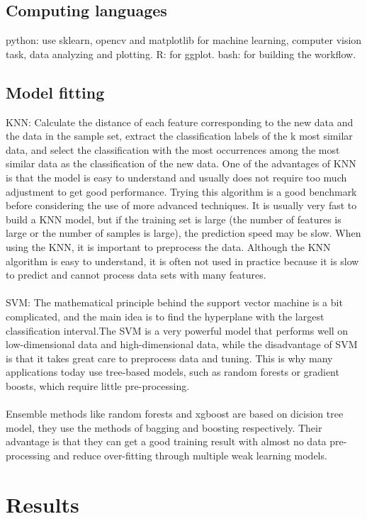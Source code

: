 \documentclass[11pt]{article}
\begin{document}
\subsection{Computing languages}
python: use sklearn, opencv and matplotlib for machine learning, computer vision task, data analyzing and plotting.
R: for ggplot.
bash: for building the workflow.


\subsection{Model fitting}
KNN: Calculate the distance of each feature corresponding to the new data and the data in the sample set, extract the classification labels of the k most similar data, and select the classification with the most occurrences among the most similar data as the classification of the new data. One of the advantages of KNN is that the model is easy to understand and usually does not require too much adjustment to get good performance. Trying this algorithm is a good benchmark before considering the use of more advanced techniques. It is usually very fast to build a KNN model,  but if the training set is large (the number of features is large or the number of samples is large), the prediction speed may be slow. When using the KNN, it is important to preprocess the data. Although the KNN algorithm is easy to understand, it is often not used in practice because it is slow to predict and cannot process data sets with many features.
\\
\\
SVM: The mathematical principle behind the support vector machine is a bit complicated, and the main idea is to find the hyperplane with the largest classification interval.The SVM is a very powerful model that performs well on low-dimensional data and high-dimensional data, while the disadvantage of SVM is that it takes great care to preprocess data and tuning. This is why many applications today use tree-based models, such as random forests or gradient boosts, which require little pre-processing. 
\\
\\
Ensemble methods like random forests and xgboost are based on dicision tree model, they use the methods of bagging and boosting respectively. Their advantage is that they can get a good training result with almost no data pre-processing and reduce over-fitting through multiple weak learning models. 



\section{Results}
\end{document}
